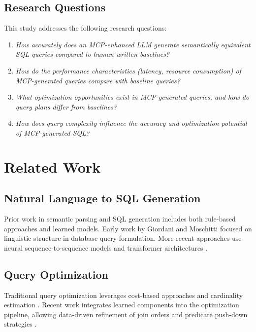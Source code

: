 \documentclass[11pt,a4paper]{article}
\begin{document}
\subsection{Research Questions}
This study addresses the following research questions:

\begin{enumerate}
    \item[RQ1:] \textit{How accurately does an MCP-enhanced LLM generate semantically equivalent SQL queries compared to human-written baselines?}
    
    \item[RQ2:] \textit{How do the performance characteristics (latency, resource consumption) of MCP-generated queries compare with baseline queries?}
    
    \item[RQ3:] \textit{What optimization opportunities exist in MCP-generated queries, and how do query plans differ from baselines?}
    
    \item[RQ4:] \textit{How does query complexity influence the accuracy and optimization potential of MCP-generated SQL?}
\end{enumerate}

\section{Related Work}

\subsection{Natural Language to SQL Generation}
Prior work in semantic parsing and SQL generation includes both rule-based approaches and learned models. Early work by Giordani and Moschitti \cite{giordani2012semantic} focused on linguistic structure in database query formulation. More recent approaches use neural sequence-to-sequence models and transformer architectures \cite{zhong2017seq2sql, yu2018typesql}.

\subsection{Query Optimization}
Traditional query optimization leverages cost-based approaches and cardinality estimation \cite{selinger1979access}. Recent work integrates learned components into the optimization pipeline, allowing data-driven refinement of join orders and predicate push-down strategies \cite{marcus2019learned}.
\end{document}

